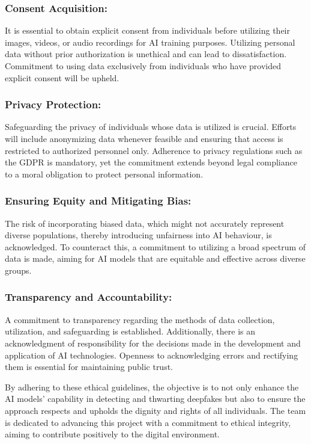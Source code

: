 \documentclass{article} %
\begin{document}
\subsubsection*{\textbf{Consent Acquisition:}}
 It is essential to obtain explicit consent from individuals before utilizing their images, videos, or audio recordings for AI training purposes. Utilizing personal data without prior authorization is unethical and can lead to dissatisfaction. Commitment to using data exclusively from individuals who have provided explicit consent will be upheld.

\subsubsection*{\textbf{Privacy Protection:}}
Safeguarding the privacy of individuals whose data is utilized is crucial. Efforts will include anonymizing data whenever feasible and ensuring that access is restricted to authorized personnel only. Adherence to privacy regulations such as the GDPR is mandatory, yet the commitment extends beyond legal compliance to a moral obligation to protect personal information.

\subsubsection*{\textbf{Ensuring Equity and Mitigating Bias:}}
 The risk of incorporating biased data, which might not accurately represent diverse populations, thereby introducing unfairness into AI behaviour, is acknowledged. To counteract this, a commitment to utilizing a broad spectrum of data is made, aiming for AI models that are equitable and effective across diverse groups.

\subsubsection*{\textbf{Transparency and Accountability:}}
A commitment to transparency regarding the methods of data collection, utilization, and safeguarding is established. Additionally, there is an acknowledgment of responsibility for the decisions made in the development and application of AI technologies. Openness to acknowledging errors and rectifying them is essential for maintaining public trust.

By adhering to these ethical guidelines, the objective is to not only enhance the AI models' capability in detecting and thwarting deepfakes but also to ensure the approach respects and upholds the dignity and rights of all individuals. The team is dedicated to advancing this project with a commitment to ethical integrity, aiming to contribute positively to the digital environment.
\end{document}
